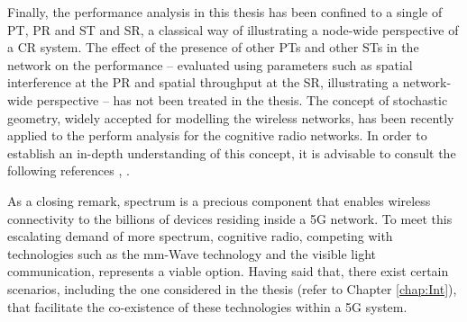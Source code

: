Finally, the performance analysis in this thesis has been confined to a single of PT, PR and ST and SR, a classical way of illustrating a node-wide perspective of a CR system. The effect of the presence of other PTs and other STs in the network on the performance -- evaluated using parameters such as spatial interference at the PR and spatial throughput at the SR, illustrating a network-wide perspective -- has not been treated in the thesis. The concept of stochastic geometry, widely accepted for modelling the wireless networks, has been recently applied to the perform analysis for the cognitive radio networks. In order to establish an in-depth understanding of this concept, it is advisable to consult the following references \cite{Ghasemi08, Lee12, Kusal12, Kusal13, Elsawy13, Song14}, . 

As a closing remark, spectrum is a precious component that enables wireless connectivity to the billions of devices residing inside a 5G network. To meet this escalating demand of more spectrum, cognitive radio, competing with technologies such as the mm-Wave technology and the visible light communication, represents a viable option. Having said that, there exist certain scenarios, including the one considered in the thesis (refer to Chapter \ref{chap:Int}), that facilitate the co-existence of these technologies within a 5G system. 







